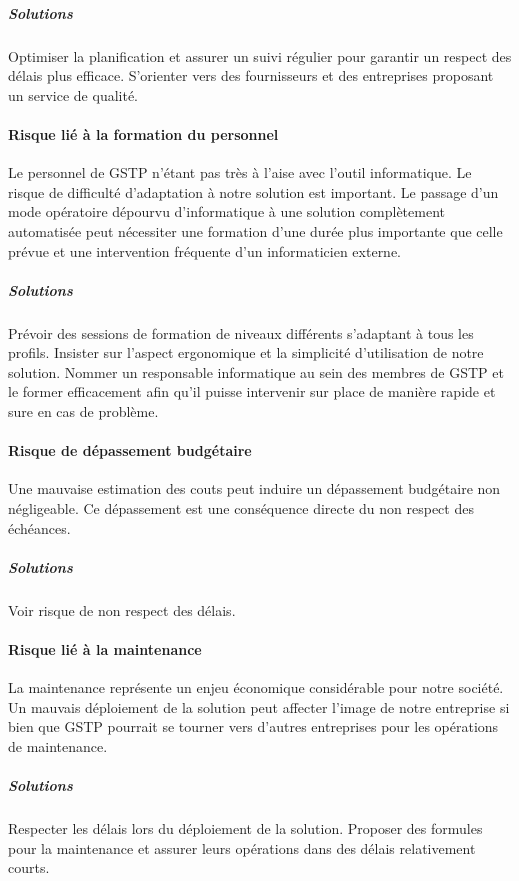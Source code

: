 \subparagraph{Solutions\\}
Optimiser la planification et assurer un suivi régulier pour garantir un respect des délais plus efficace. S'orienter vers des fournisseurs et des entreprises proposant un service de qualité.

\paragraph{Risque lié à la formation du personnel\\}
Le personnel de GSTP n'étant pas très à l'aise avec l'outil informatique. Le risque de difficulté d'adaptation à notre solution est important. Le passage d'un mode opératoire dépourvu d'informatique à une solution complètement automatisée peut nécessiter une formation d'une durée plus importante que celle prévue et une intervention fréquente d'un informaticien externe.

\subparagraph{Solutions\\}
Prévoir des sessions de formation de niveaux différents s'adaptant à tous les profils. Insister sur l'aspect ergonomique et la simplicité d'utilisation
de notre solution. Nommer un responsable informatique au sein des membres de GSTP et le former efficacement afin qu'il puisse intervenir sur place de manière rapide et sure en cas de problème.


\paragraph{Risque de dépassement budgétaire\\}
Une mauvaise estimation des couts peut induire un dépassement budgétaire non négligeable. Ce dépassement est une conséquence directe du non respect des échéances.

\subparagraph{Solutions\\}
Voir risque de non respect des délais.

\paragraph{Risque lié à la maintenance\\}
La maintenance représente un enjeu économique considérable pour notre société. Un mauvais déploiement de la solution peut affecter l'image de notre entreprise si bien que GSTP pourrait se tourner vers d'autres entreprises pour les opérations de maintenance.

\subparagraph{Solutions\\}
Respecter les délais lors du déploiement de la solution. Proposer des formules pour la maintenance et assurer leurs opérations dans des délais relativement courts.

